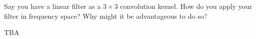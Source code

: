 \begin{blocksection}
\question Say you have a linear filter as a $3 \times 3$ convolution kernel. How do you apply your filter in frequency space? Why might it be advantageous to do so?

\begin{solution}[0.75in]
{\color{red} TBA}
\end{solution}
\end{blocksection}
